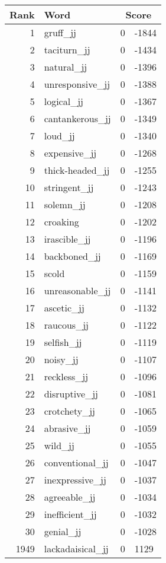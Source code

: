 \begin{longtable}[!htbp]{| rlr@{.}l |}
    \hline
    \textbf{Rank} & \textbf{Word} & \multicolumn{2}{c|}{\textbf{Score}} \\
    \hline
    \endhead
    1 & gruff\_jj & 0 & -1844 \\
    2 & taciturn\_jj & 0 & -1434 \\
    3 & natural\_jj & 0 & -1396 \\
    4 & unresponsive\_jj & 0 & -1388 \\
    5 & logical\_jj & 0 & -1367 \\
    6 & cantankerous\_jj & 0 & -1349 \\
    7 & loud\_jj & 0 & -1340 \\
    8 & expensive\_jj & 0 & -1268 \\
    9 & thick-headed\_jj & 0 & -1255 \\
    10 & stringent\_jj & 0 & -1243 \\
    11 & solemn\_jj & 0 & -1208 \\
    12 & croaking & 0 & -1202 \\
    13 & irascible\_jj & 0 & -1196 \\
    14 & backboned\_jj & 0 & -1169 \\
    15 & scold & 0 & -1159 \\
    16 & unreasonable\_jj & 0 & -1141 \\
    17 & ascetic\_jj & 0 & -1132 \\
    18 & raucous\_jj & 0 & -1122 \\
    19 & selfish\_jj & 0 & -1119 \\
    20 & noisy\_jj & 0 & -1107 \\
    21 & reckless\_jj & 0 & -1096 \\
    22 & disruptive\_jj & 0 & -1081 \\
    23 & crotchety\_jj & 0 & -1065 \\
    24 & abrasive\_jj & 0 & -1059 \\
    25 & wild\_jj & 0 & -1055 \\
    26 & conventional\_jj & 0 & -1047 \\
    27 & inexpressive\_jj & 0 & -1037 \\
    28 & agreeable\_jj & 0 & -1034 \\
    29 & inefficient\_jj & 0 & -1032 \\
    30 & genial\_jj & 0 & -1028 \\
    1949 & lackadaisical\_jj & 0 & 1129 \\

\end{longtable}
